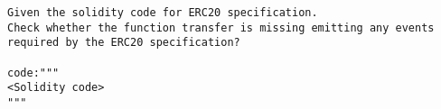 \begin{lstlisting}[label={lst:exp-inst-st3},captionpos=b, caption={Example of prompt in instruction experiment setting-3},language=GPTPrompt]
Given the solidity code for ERC20 specification.
Check whether the function transfer is missing emitting any events required by the ERC20 specification?

code:"""
<Solidity code>
"""
\end{lstlisting}